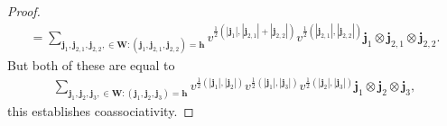 \documentclass[11pt]{article}
\numberwithin{equation}{section}
\begin{document}
\begin{proof}
\begin{gather*}
=\sum\limits_{\mathbf{j}_1,\mathbf{j}_{2,1},\mathbf{j}_{2,2},\in\mathbf{W}:(\mathbf{j}_1,\mathbf{j}_{2,1},\mathbf{j}_{2,2})=\mathbf{h}}
v^{\frac{1}{2}(|\mathbf{j}_1|,|\mathbf{j}_{2,1}|+|\mathbf{j}_{2,2}|)}v^{\frac{1}{2}(|\mathbf{j}_{2,1}|,|\mathbf{j}_{2,2}|)}
\mathbf{j}_1\otimes\mathbf{j}_{2,1}\otimes\mathbf{j}_{2,2}.
\end{gather*}
But both of these are equal to
\begin{gather*}
\sum\limits_{\mathbf{j}_1,\mathbf{j}_2,\mathbf{j}_3,\in\mathbf{W}:(\mathbf{j}_1,\mathbf{j}_2,\mathbf{j}_3)=\mathbf{h}}
v^{\frac{1}{2}(|\mathbf{j}_1|,|\mathbf{j}_2|)}v^{\frac{1}{2}(|\mathbf{j}_1|,|\mathbf{j}_3|)}
v^{\frac{1}{2}(|\mathbf{j}_2|,|\mathbf{j}_3|)}\mathbf{j}_1\otimes\mathbf{j}_2\otimes\mathbf{j}_3,
\end{gather*}
this establishes coassociativity.


\end{proof}
\end{document}

